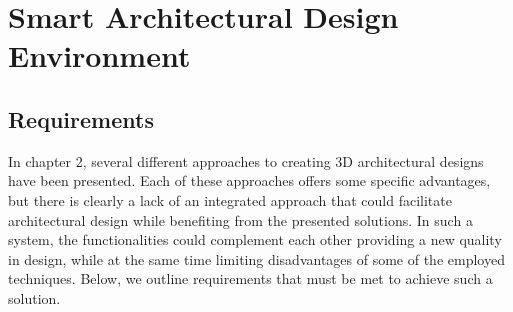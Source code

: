 \documentclass[runningheads]{llncs}
\begin{document}
\section{Smart Architectural Design Environment}

\subsection{Requirements}
In chapter 2, several different approaches to creating 3D architectural designs have been presented. Each of these approaches offers some specific advantages, but there is clearly a lack of an integrated approach that could facilitate architectural design while benefiting from the presented solutions. In such a system, the functionalities could complement each other providing a new quality in design, while at the same time limiting disadvantages of some of the employed techniques. Below, we outline requirements that must be met to achieve such a solution.
\end{document}
